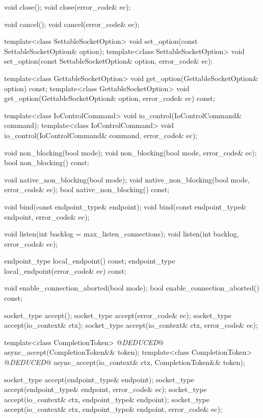 \begin{codeblock}
{{{{{    void close();
    void close(error_code& ec);

    void cancel();
    void cancel(error_code& ec);

    template<class SettableSocketOption>
      void set_option(const SettableSocketOption& option);
    template<class SettableSocketOption>
      void set_option(const SettableSocketOption& option, error_code& ec);

    template<class GettableSocketOption>
      void get_option(GettableSocketOption& option) const;
    template<class GettableSocketOption>
      void get_option(GettableSocketOption& option, error_code& ec) const;

    template<class IoControlCommand>
      void io_control(IoControlCommand& command);
    template<class IoControlCommand>
      void io_control(IoControlCommand& command, error_code& ec);

    void non_blocking(bool mode);
    void non_blocking(bool mode, error_code& ec);
    bool non_blocking() const;

    void native_non_blocking(bool mode);
    void native_non_blocking(bool mode, error_code& ec);
    bool native_non_blocking() const;

    void bind(const endpoint_type& endpoint);
    void bind(const endpoint_type& endpoint, error_code& ec);

    void listen(int backlog = max_listen_connections);
    void listen(int backlog, error_code& ec);

    endpoint_type local_endpoint() const;
    endpoint_type local_endpoint(error_code& ec) const;

    void enable_connection_aborted(bool mode);
    bool enable_connection_aborted() const;

    socket_type accept();
    socket_type accept(error_code& ec);
    socket_type accept(io_context& ctx);
    socket_type accept(io_context& ctx, error_code& ec);

    template<class CompletionToken>
      @\textit{DEDUCED}@ async_accept(CompletionToken&& token);
    template<class CompletionToken>
      @\textit{DEDUCED}@ async_accept(io_context& ctx, CompletionToken&& token);

    socket_type accept(endpoint_type& endpoint);
    socket_type accept(endpoint_type& endpoint, error_code& ec);
    socket_type accept(io_context& ctx, endpoint_type& endpoint);
    socket_type accept(io_context& ctx, endpoint_type& endpoint,
                       error_code& ec);

}}}}}
\end{codeblock}
